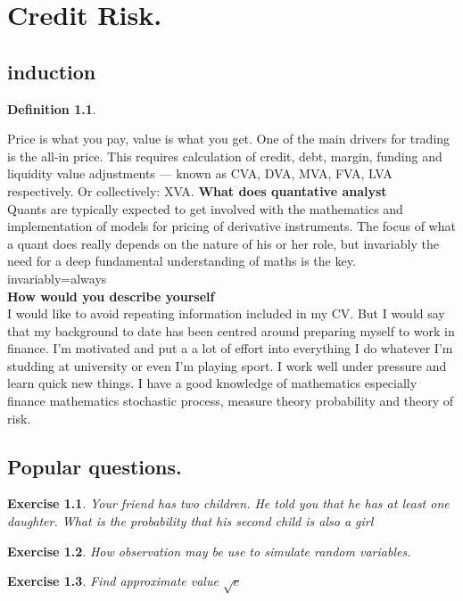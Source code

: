 \documentclass{book}
\newtheorem{definition}{Definition}[section]
\newtheorem{exercise}{Exercise}[section]
\begin{document}
\chapter{Credit Risk.}
\section{induction}
\begin{definition}

\end{definition}
Price is what you pay, value is what you get.
One of the main drivers for trading is the all-in price. This requires calculation of credit, debt, margin, funding and liquidity value adjustments — known as CVA, DVA, MVA, FVA, LVA respectively. Or collectively: XVA. 
\textbf{What does quantative analyst}\\
Quants are typically expected to get involved with the mathematics and implementation of models for pricing of derivative instruments. The focus of what a quant does really depends on the nature of his or her role, but invariably the need for a deep fundamental understanding of maths is the key.\\
invariably=always\\
\textbf{How would you describe yourself}\\
I would like to avoid repeating information included in my CV. But I would say that my background to date has been centred around preparing myself to work in finance. I'm motivated and put a a lot of effort into everything I do whatever I'm studding at university or even I'm playing sport. I work well under pressure and learn quick new things. I have a good knowledge of mathematics especially finance mathematics stochastic process, measure theory probability and theory of risk.\\
\section{Popular questions.}
\begin{exercise}
Your friend has two children. He told you that he has at least one daughter. What is the probability that his second child is also a girl 
\end{exercise}
\begin{exercise}
How observation may be use to simulate random variables.
\end{exercise}
\begin{exercise}
Find approximate value $\sqrt{e}$
\end{exercise}
\end{document}
